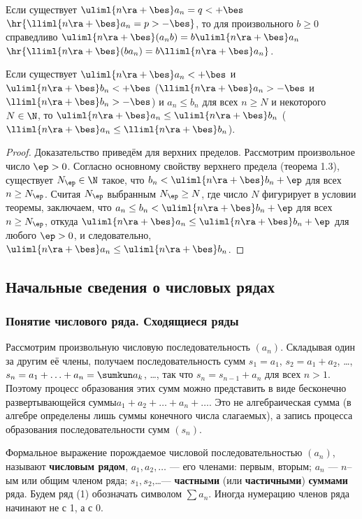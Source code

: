 \documentclass[a4paper]{article}
\newenvironment{imp*}{\par\vskip\theoremskip\textbf{Следствие.}\normalfont \itshape}{\par\vskip\theoremskip}
\begin{document}
\begin{imp*}
Если существует $\uliml{n\ra+\bes}a_n=q<+\bes$
$\hr{\lliml{n\ra+\bes}a_n=p>-\bes}$, то для произвольного $b\ge0$
справедливо $\uliml{n\ra+\bes} (a_n b)=b \uliml{n\ra+\bes}a_n$
$\hr{\lliml{n\ra+\bes}(ba_n)=b \lliml{n\ra+\bes}a_n}$.
\end{imp*}

\begin{theorem}
Если существует $\uliml{n\ra+\bes}a_n<+\bes$ и
$\uliml{n\ra+\bes}b_n<+\bes$ ($\lliml{n\ra+\bes}a_n>-\bes$ и
$\lliml{n\ra+\bes}b_n>-\bes$) и $a_n \le b_n$ для всех $n\ge N$ и
некоторого $N\in\N$, то $\uliml{n\ra+\bes}a_n \le
\uliml{n\ra+\bes}b_n$ ($\lliml{n\ra+\bes}a_n \le
\lliml{n\ra+\bes}b_n$).
\end{theorem}

\begin{proof}
Доказательство приведём для верхних пределов. Рассмотрим
произвольное число $\ep>0$. Согласно основному свойству верхнего
предела (теорема 1.3), существует $N_{\ep} \in \N$ такое, что $b_n <
\uliml{n\ra+\bes}b_n + \ep$ для всех $n\ge N_{\ep}$. Считая
$N_{\ep}$ выбранным $N_{\ep} \ge N$, где число $N$ фигурирует в
условии теоремы, заключаем, что $a_n \le b_n < \uliml{n\ra+\bes} b_n
+ \ep$ для всех $n\ge N_{\ep}$, откуда $\uliml{n\ra+\bes}a_n \le
\uliml{n\ra+\bes}b_n + \ep$ для любого $\ep>0$, и следовательно,
$\uliml{n\ra+\bes}a_n \le \uliml{n\ra+\bes}b_n$.
\end{proof}

\subsection{Начальные сведения о числовых рядах}
\subsubsection{Понятие числового ряда. Сходящиеся ряды}

Рассмотрим произвольную числовую последовательность $(a_n)$.
Складывая один за другим её члены, получаем последовательность сумм
$s_1=a_1$, $s_2=a_1+a_2$, \ldots, $s_n=a_1+\ldots+a_n=\sumkun a_k$,
\ldots, так что $s_n=s_{n-1}+a_n$ для всех $n>1$. Поэтому процесс
образования этих сумм можно представить в виде  бесконечно
развертывающейся суммы $a_1+a_2+\ldots+a_n+\ldots$. Это не
алгебраическая сумма (в алгебре определены лишь суммы конечного
числа слагаемых), а запись процесса образования последовательности
сумм $(s_n)$.

Формальное выражение  порождаемое
числовой последовательностью $(a_n)$, называют \textbf{числовым
рядом}, $a_1,a_2,\ldots$ --- его членами: первым, вторым; $a_n$ ---
$n$--ым или общим членом ряда; $s_1,s_2$,\ldots ---
\textbf{частными} (или \textbf{частичными}) \textbf{суммами} ряда.
Будем ряд (1) обозначать символом $\sum a_n$. Иногда нумерацию
членов ряда начинают не с 1, а с 0.
\end{document}
